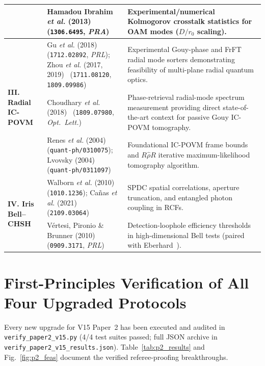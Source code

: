 \documentclass[10pt,letterpaper]{article}
\begin{document}
\begin{table}[t]
\begin{tabularx}{\linewidth}{@{}l>{\raggedright\arraybackslash}p{4.6cm}>{\raggedright\arraybackslash}X@{}}
  & Hamadou Ibrahim \emph{et al.} (2013)~\cite{Ibrahim2013} (\texttt{1306.6495}, \emph{PRA}) & Experimental/numerical Kolmogorov crosstalk statistics for OAM modes ($D/r_0$ scaling). \\
\midrule
\multirow{3}{*}{\textbf{III. Radial IC-POVM}}
  & Gu \emph{et al.} (2018)~\cite{Gu2018} (\texttt{1712.02892}, \emph{PRL}); Zhou \emph{et al.} (2017, 2019)~\cite{Zhou2017,Zhou2019} (\texttt{1711.08120}, \texttt{1809.09986}) & Experimental Gouy-phase and FrFT radial mode sorters demonstrating feasibility of multi-plane radial quantum optics. \\
  & Choudhary \emph{et al.} (2018)~\cite{Choudhary2018} (\texttt{1809.07980}, \emph{Opt.\ Lett.}) & Phase-retrieval radial-mode spectrum measurement providing direct state-of-the-art context for passive Gouy IC-POVM tomography. \\
  & Renes \emph{et al.} (2004)~\cite{Renes2004} (\texttt{quant-ph/0310075}); Lvovsky (2004)~\cite{Lvovsky2004} (\texttt{quant-ph/0311097}) & Foundational IC-POVM frame bounds and $R\hat{\rho}R$ iterative maximum-likelihood tomography algorithm. \\
\midrule
\multirow{2}{*}{\textbf{IV. Iris Bell--CHSH}}
  & Walborn \emph{et al.} (2010)~\cite{Walborn2010} (\texttt{1010.1236}); Ca\~nas \emph{et al.} (2021)~\cite{Canas2021} (\texttt{2109.03064}) & SPDC spatial correlations, aperture truncation, and entangled photon coupling in RCFs. \\
  & V\'ertesi, Pironio \& Brunner (2010)~\cite{Vertesi2010} (\texttt{0909.3171}, \emph{PRL}) & Detection-loophole efficiency thresholds in high-dimensional Bell tests (paired with Eberhard~\cite{Eberhard1993}). \\
\bottomrule
\end{tabularx}
\end{table}

\section{First-Principles Verification of All Four Upgraded Protocols}
\label{sec:p2_verify}

Every new upgrade for V15 Paper~2 has been executed and audited in \texttt{verify\_paper2\_v15.py} (4/4 test suites passed; full JSON archive in \texttt{verify\_paper2\_v15\_results.json}). Table~\ref{tab:p2_results} and Fig.~\ref{fig:p2_feas} document the verified referee-proofing breakthroughs.
\end{document}
